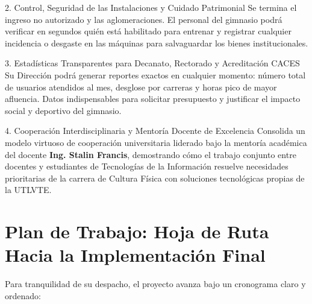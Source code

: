 \documentclass[11pt,a4paper]{article}
\begin{document}
\begin{calloutbox}{2. Control, Seguridad de las Instalaciones y Cuidado Patrimonial}
Se termina el ingreso no autorizado y las aglomeraciones. El personal del gimnasio podrá verificar en segundos quién está habilitado para entrenar y registrar cualquier incidencia o desgaste en las máquinas para salvaguardar los bienes institucionales.
\end{calloutbox}

\begin{calloutbox}{3. Estadísticas Transparentes para Decanato, Rectorado y Acreditación CACES}
Su Dirección podrá generar reportes exactos en cualquier momento: número total de usuarios atendidos al mes, desglose por carreras y horas pico de mayor afluencia. Datos indispensables para solicitar presupuesto y justificar el impacto social y deportivo del gimnasio.
\end{calloutbox}

\begin{calloutbox}{4. Cooperación Interdisciplinaria y Mentoría Docente de Excelencia}
Consolida un modelo virtuoso de cooperación universitaria liderado bajo la mentoría académica del docente \textbf{Ing. Stalin Francis}, demostrando cómo el trabajo conjunto entre docentes y estudiantes de Tecnologías de la Información resuelve necesidades prioritarias de la carrera de Cultura Física con soluciones tecnológicas propias de la UTLVTE.
\end{calloutbox}

\vspace{2mm}

\section{Plan de Trabajo: Hoja de Ruta Hacia la Implementación Final}

Para tranquilidad de su despacho, el proyecto avanza bajo un cronograma claro y ordenado:
\end{document}
